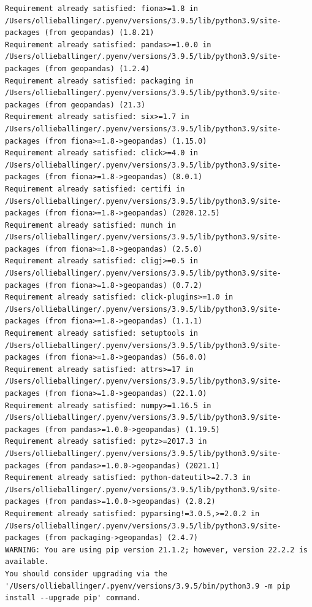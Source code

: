 \documentclass[
  letterpaper,
  DIV=11,
  numbers=noendperiod]{scrreprt}
\begin{document}
\begin{verbatim}
Requirement already satisfied: fiona>=1.8 in /Users/ollieballinger/.pyenv/versions/3.9.5/lib/python3.9/site-packages (from geopandas) (1.8.21)
Requirement already satisfied: pandas>=1.0.0 in /Users/ollieballinger/.pyenv/versions/3.9.5/lib/python3.9/site-packages (from geopandas) (1.2.4)
Requirement already satisfied: packaging in /Users/ollieballinger/.pyenv/versions/3.9.5/lib/python3.9/site-packages (from geopandas) (21.3)
Requirement already satisfied: six>=1.7 in /Users/ollieballinger/.pyenv/versions/3.9.5/lib/python3.9/site-packages (from fiona>=1.8->geopandas) (1.15.0)
Requirement already satisfied: click>=4.0 in /Users/ollieballinger/.pyenv/versions/3.9.5/lib/python3.9/site-packages (from fiona>=1.8->geopandas) (8.0.1)
Requirement already satisfied: certifi in /Users/ollieballinger/.pyenv/versions/3.9.5/lib/python3.9/site-packages (from fiona>=1.8->geopandas) (2020.12.5)
Requirement already satisfied: munch in /Users/ollieballinger/.pyenv/versions/3.9.5/lib/python3.9/site-packages (from fiona>=1.8->geopandas) (2.5.0)
Requirement already satisfied: cligj>=0.5 in /Users/ollieballinger/.pyenv/versions/3.9.5/lib/python3.9/site-packages (from fiona>=1.8->geopandas) (0.7.2)
Requirement already satisfied: click-plugins>=1.0 in /Users/ollieballinger/.pyenv/versions/3.9.5/lib/python3.9/site-packages (from fiona>=1.8->geopandas) (1.1.1)
Requirement already satisfied: setuptools in /Users/ollieballinger/.pyenv/versions/3.9.5/lib/python3.9/site-packages (from fiona>=1.8->geopandas) (56.0.0)
Requirement already satisfied: attrs>=17 in /Users/ollieballinger/.pyenv/versions/3.9.5/lib/python3.9/site-packages (from fiona>=1.8->geopandas) (22.1.0)
Requirement already satisfied: numpy>=1.16.5 in /Users/ollieballinger/.pyenv/versions/3.9.5/lib/python3.9/site-packages (from pandas>=1.0.0->geopandas) (1.19.5)
Requirement already satisfied: pytz>=2017.3 in /Users/ollieballinger/.pyenv/versions/3.9.5/lib/python3.9/site-packages (from pandas>=1.0.0->geopandas) (2021.1)
Requirement already satisfied: python-dateutil>=2.7.3 in /Users/ollieballinger/.pyenv/versions/3.9.5/lib/python3.9/site-packages (from pandas>=1.0.0->geopandas) (2.8.2)
Requirement already satisfied: pyparsing!=3.0.5,>=2.0.2 in /Users/ollieballinger/.pyenv/versions/3.9.5/lib/python3.9/site-packages (from packaging->geopandas) (2.4.7)
WARNING: You are using pip version 21.1.2; however, version 22.2.2 is available.
You should consider upgrading via the '/Users/ollieballinger/.pyenv/versions/3.9.5/bin/python3.9 -m pip install --upgrade pip' command.
\end{verbatim}
\end{document}
